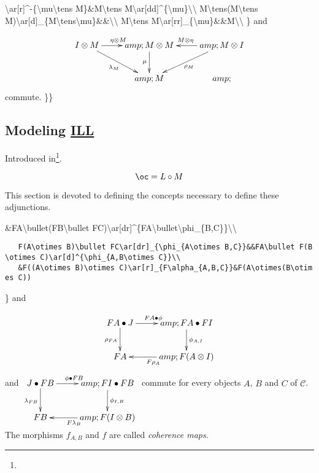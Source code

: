\textbackslash{}ar{[}r{]}\^{}-\{\textbackslash{}mu\textbackslash{}tens
M\}\&M\textbackslash{}tens
M\textbackslash{}ar{[}dd{]}\^{}\{\textbackslash{}mu\}\textbackslash{}\textbackslash{}
M\textbackslash{}tens(M\textbackslash{}tens
M)\textbackslash{}ar{[}d{]}\_\{M\textbackslash{}tens\textbackslash{}mu\}\&\&\textbackslash{}\textbackslash{}
M\textbackslash{}tens
M\textbackslash{}ar{[}rr{]}\_\{\textbackslash{}mu\}\&\&M\textbackslash{}\textbackslash{}
\} and

\[\xymatrix{
I\tens M\ar[r]^{\eta\tens M}\ar[dr]_{\lambda_M}&amp;M\tens M\ar[d]_\mu&amp;\ar[l]_{M\tens\eta}\ar[dl]^{\rho_M}M\tens I\\
&amp;M&amp;
}\] commute. \}\}

\subsection{\texorpdfstring{Modeling
\url{ILL}}{Modeling ILL}}\label{modeling-ill}

Introduced in\footnote{}.

\[\oc=L\circ M\]

This section is devoted to defining the concepts necessary to define
these adjunctions.

\&FA\textbackslash{}bullet(FB\textbackslash{}bullet
FC)\textbackslash{}ar{[}dr{]}\^{}\{FA\textbackslash{}bullet\textbackslash{}phi\_\{B,C\}\}\textbackslash{}\textbackslash{}

\texttt{~~~F(A\textbackslash{}otimes~B)\textbackslash{}bullet~FC\textbackslash{}ar{[}dr{]}\_\{\textbackslash{}phi\_\{A\textbackslash{}otimes~B,C\}\}\&\&FA\textbackslash{}bullet~F(B\textbackslash{}otimes~C)\textbackslash{}ar{[}d{]}\^{}\{\textbackslash{}phi\_\{A,B\textbackslash{}otimes~C\}\}\textbackslash{}\textbackslash{}}\\
\texttt{~~~\&F((A\textbackslash{}otimes~B)\textbackslash{}otimes~C)\textbackslash{}ar{[}r{]}\_\{F\textbackslash{}alpha\_\{A,B,C\}\}\&F(A\textbackslash{}otimes(B\textbackslash{}otimes~C))}

\} and

\[\xymatrix{
    FA\bullet J\ar[d]_{\rho_{FA}}\ar[r]^{FA\bullet\phi}&amp;FA\bullet FI\ar[d]^{\phi_{A,I}}\\
    FA&amp;\ar[l]^{F\rho_A}F(A\otimes I)
}\] and \(\xymatrix{
    J\bullet FB\ar[d]_{\lambda_{FB}}\ar[r]^{\phi\bullet FB}&amp;FI\bullet FB\ar[d]^{\phi_{I,B}}\\
    FB&amp;\ar[l]^{F\lambda_B}F(I\otimes B)
}\) commute for every objects \(A\), \(B\) and \(C\) of \(\mathcal{C}\).
The morphisms \(f_{A,B}\) and \(f\) are called \emph{coherence maps}.

